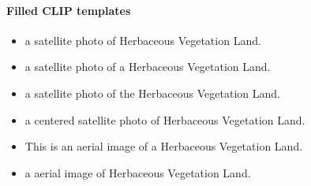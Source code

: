 \documentclass[11pt]{article}
\begin{document}
\paragraph{Filled CLIP templates}\begin{itemize}
\item a satellite photo of Herbaceous Vegetation Land.
\item a satellite photo of a Herbaceous Vegetation Land.
\item a satellite photo of the Herbaceous Vegetation Land.
\item a centered satellite photo of Herbaceous Vegetation Land.
\item This is an aerial image of a Herbaceous Vegetation Land.
\item a aerial image of Herbaceous Vegetation Land.
\end{itemize}
\end{document}
